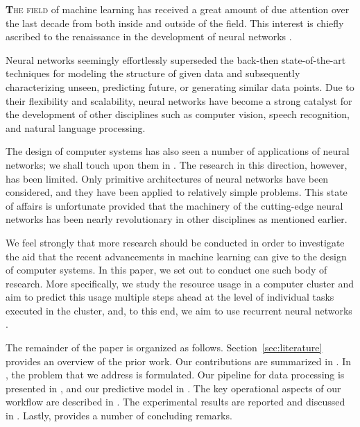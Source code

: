 \lettrine[findent=0.2em, nindent=0em]{\textbf{T}}{he field} of machine learning
has received a great amount of due attention over the last decade from both
inside and outside of the field. This interest is chiefly ascribed to the
renaissance in the development of neural networks \cite{goodfellow2016}.

Neural networks seemingly effortlessly superseded the back-then state-of-the-art
techniques for modeling the structure of given data and subsequently
characterizing unseen, predicting future, or generating similar data points. Due
to their flexibility and scalability, neural networks have become a strong
catalyst for the development of other disciplines such as computer vision,
speech recognition, and natural language processing.

The design of computer systems has also seen a number of applications of neural
networks; we shall touch upon them in . The research in this
direction, however, has been limited. Only primitive architectures of neural
networks have been considered, and they have been applied to relatively simple
problems. This state of affairs is unfortunate provided that the machinery of
the cutting-edge neural networks has been nearly revolutionary in other
disciplines as mentioned earlier.

We feel strongly that more research should be conducted in order to investigate
the aid that the recent advancements in machine learning can give to the design
of computer systems. In this paper, we set out to conduct one such body of
research. More specifically, we study the resource usage in a computer cluster
and aim to predict this usage multiple steps ahead at the level of individual
tasks executed in the cluster, and, to this end, we aim to use recurrent neural
networks \cite{goodfellow2016}.

The remainder of the paper is organized as follows. Section~\ref{sec:literature}
provides an overview of the prior work. Our contributions are summarized in
. In , the problem that we address is
formulated. Our pipeline for data processing is presented in , and
our predictive model in . The key operational aspects of our
workflow are described in . The experimental results are
reported and discussed in . Lastly,  provides a
number of concluding remarks.
